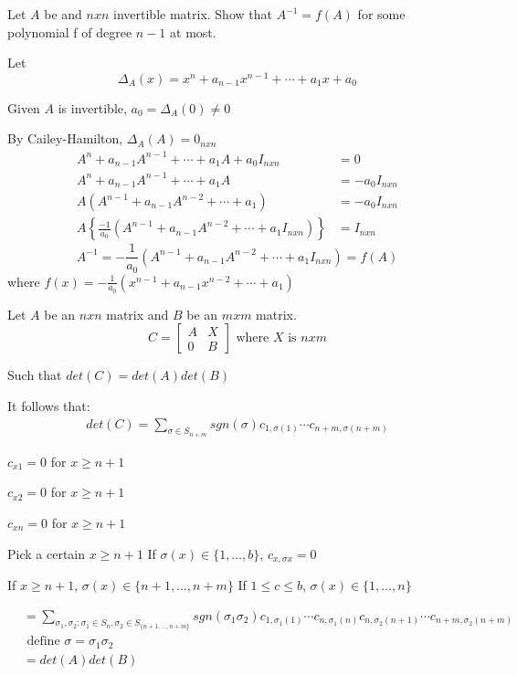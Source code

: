 \documentclass[11pt]{scrartcl}
\begin{document}
\begin{example}
	Let $A$ be and $nxn$ invertible matrix. Show that $A^{-1} = f(A)$ for some polynomial f of degree $n-1$ at most.
\end{example}

\begin{soln}
	Let 
	\[
	\Delta_A(x) = x^n + a_{n-1}x^{n-1} + \cdots + a_1x + a_0
	\]
	
	Given $A$ is invertible, $a_0 = \Delta_A(0) \neq 0$
	
	By Cailey-Hamilton, $\Delta_A(A) = 0_{nxn}$
	\begin{align*}
	A^n + a_{n-1}A^{n-1} + \cdots + a_1A + a_0I_{nxn} &= 0\\
	A^n + a_{n-1}A^{n-1} + \cdots + a_1A&= -a_0I_{nxn}\\
	A(A^{n-1} + a_{n-1}A^{n-2} + \cdots + a_1) &= -a_0I_{nxn}\\
	A\left\{\frac{-1}{a_0} (A^{n-1} + a_{n-1}A^{n-2} + \cdots + a_1I_{nxn}) \right\} &= I_{nxn}
	\end{align*}
	\[
	A^{-1} = -\frac{1}{a_0} (A^{n-1} + a_{n-1}A^{n-2} + \cdots + a_1I_{nxn}) = f(A)
	\]
	where $f(x) = -\frac{1}{a_0}(x^{n-1} + a_{n-1}x^{n-2} + \cdots + a_1)$
\end{soln}

\begin{example}
	Let $A$ be an $nxn$ matrix and $B$ be an $mxm$ matrix.
	\[
	C=
	\begin{bmatrix}
		A & X\\
		0 & B
	\end{bmatrix}
	\text{ where $X$ is $nxm$}
	\]
	
	Such that $det(C) = det(A)det(B)$
	
	It follows that:
	\begin{align*}
		det(C) = \sum_{\sigma \in S_{n+m}} sgn(\sigma) c_{1, \sigma(1)}\cdots c_{n+m, \sigma(n+m)}
	\end{align*}
	
	$c_{x1} = 0$ for $x \geq n+1$
	
	$c_{x2} = 0$ for $x \geq n+1$
	
	$c_{xn} = 0$ for $x \geq n+1$
	
	Pick a certain $x \geq n+1$ If $\sigma(x) \in \{1,\dots, b\}$, $c_{x,\sigma{x}} = 0$
	
	If $x \geq n+1$, $\sigma(x) \in \{n+1, \dots, n+m\}$
	If $1 \leq c \leq b$, $\sigma(x) \in \{1, \dots, n\}$
	
	\begin{align*}
		&=\sum_{\sigma_1, \sigma_2: \sigma_1 \in S_n, \sigma_2 \in S_{\{n+1, \dots, n+m\}}} sgn(\sigma_1 \sigma_2)  c_{1, \sigma_1(1)}\cdots c_{n, \sigma_1(n)} c_{n, \sigma_2(n+1)} \cdots c_{n+m, \sigma_2(n+m)} \\
		&\text{ define $\sigma = \sigma_1\sigma_2$}\\
		&= det(A)det(B)
	\end{align*}
\end{example}
\end{document}
